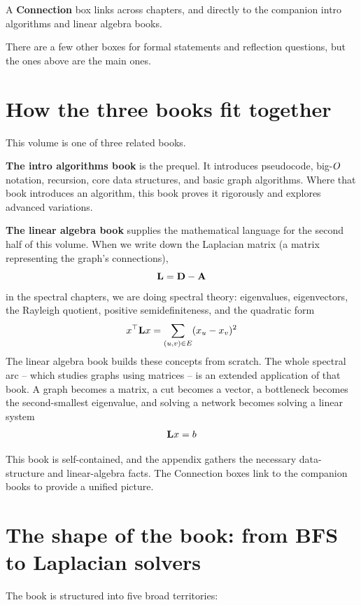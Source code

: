 \begin{connectionbox}
A \textbf{Connection} box links across chapters, and directly to the companion intro algorithms and linear algebra books.
\end{connectionbox}

There are a few other boxes for formal statements and reflection questions, but the ones above are the main ones.

\section*{How the three books fit together}

This volume is one of three related books.

\begin{connectionbox}
\textbf{The intro algorithms book} is the prequel. It introduces pseudocode, big-$O$ notation, recursion, core data structures, and basic graph algorithms. Where that book introduces an algorithm, this book proves it rigorously and explores advanced variations.

\textbf{The linear algebra book} supplies the mathematical language for the second half of this volume. When we write down the Laplacian matrix (a matrix representing the graph's connections),
\[ \mathbf{L} = \mathbf{D} - \mathbf{A} \]
in the spectral chapters, we are doing spectral theory: eigenvalues, eigenvectors, the Rayleigh quotient, positive semidefiniteness, and the quadratic form
\[ x^\top \mathbf{L} x = \sum_{(u,v)\in E}(x_u - x_v)^2 \]
The linear algebra book builds these concepts from scratch. The whole spectral arc -- which studies graphs using matrices -- is an extended application of that book. A graph becomes a matrix, a cut becomes a vector, a bottleneck becomes the second-smallest eigenvalue, and solving a network becomes solving a linear system
\[ \mathbf{L} x = b \]
\end{connectionbox}

This book is self-contained, and the appendix gathers the necessary data-structure and linear-algebra facts. The Connection boxes link to the companion books to provide a unified picture.

\section*{The shape of the book: from BFS to Laplacian solvers}

The book is structured into five broad territories:


